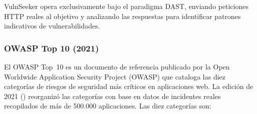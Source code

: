 \documentclass[12pt, a4paper]{article}
\begin{document}
VulnSeeker opera exclusivamente bajo el paradigma DAST, enviando peticiones HTTP
reales al objetivo y analizando las respuestas para identificar patrones
indicativos de vulnerabilidades.

\subsubsection{OWASP Top 10 (2021)}

El OWASP Top~10 es un documento de referencia publicado por la Open Worldwide
Application Security Project (OWASP) que cataloga las diez categorías de riesgos
de seguridad más críticos en aplicaciones web. La edición de 2021
(\cite{owasp2021}) reorganizó las categorías con base en datos de incidentes
reales recopilados de más de 500.000 aplicaciones. Las diez categorías son:
\end{document}

